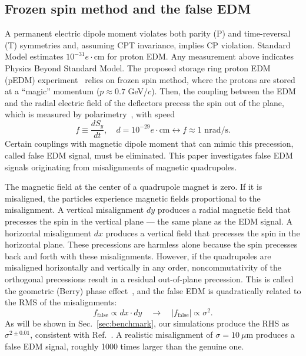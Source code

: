 \documentclass[aps,prab,reprint,superscriptaddress,nofootinbib]{revtex4-2}
\begin{document}
	\subsection{Frozen spin method and the false EDM}
	\label{sec:frozenspin}
	A permanent electric dipole moment violates both parity (P) and time-reversal (T) symmetries and, assuming CPT invariance, implies CP violation. Standard Model estimates $10^{-31} e\cdot$cm for proton EDM. Any measurement above indicates Physics Beyond Standard Model. The proposed storage ring proton EDM (pEDM) experiment~\cite{srEDM,omarov} relies on frozen spin method, where the protons are stored at a ``magic'' momentum ($p\approx 0.7 $ GeV/$c$). Then, the coupling between the EDM and the radial electric field of the deflectors precess the spin out of the plane, which is measured by polarimetry~\cite{polarimeter}, with speed
	\begin{equation}
		f \equiv \frac{dS_y}{dt}, \quad d=10^{-29} e\cdot\text{cm} \longleftrightarrow f \approx 1 \text{ nrad/s}.
	\end{equation}
	Certain couplings with magnetic dipole moment that can mimic this precession, called false EDM signal, must be eliminated. This paper investigates false EDM signals originating from misalignments of magnetic quadrupoles.

	The magnetic field at the center of a quadrupole magnet is zero. If it is misaligned, the particles experience magnetic fields proportional to the misalignment. A vertical misalignment $dy$ produces a radial magnetic field that precesses the spin in the vertical plane --- the same plane as the EDM signal. A horizontal misalignment $dx$ produces a vertical field that precesses the spin in the horizontal plane. These precessions are harmless alone because the spin precesses back and forth with these misalignments. However, if the quadrupoles are misaligned horizontally and vertically in any order, noncommutativity of the orthogonal precessions result in a residual out-of-plane precession. This is called the geometric (Berry) phase effect~\cite{berry1984,aharonov1987,farley2004,haciomeroglu2019}, and the false EDM is quadratically related to the RMS of the misalignments:
	\begin{equation}
		f_\text{false} \propto dx\cdot dy \quad \rightarrow \quad \vert f_\text{false} \vert \propto \sigma^2.
		\label{Eq:sigma_quadratic}
	\end{equation}
	As will be shown in Sec.~\ref{sec:benchmark}, our simulations produce the RHS as $\sigma^{2 \pm 0.01}$, consistent with Ref.~\cite{omarov}. A realistic misalignment of $\sigma = 10~\mu$m produces a false EDM signal, roughly 1000 times larger than the genuine one.
\end{document}
